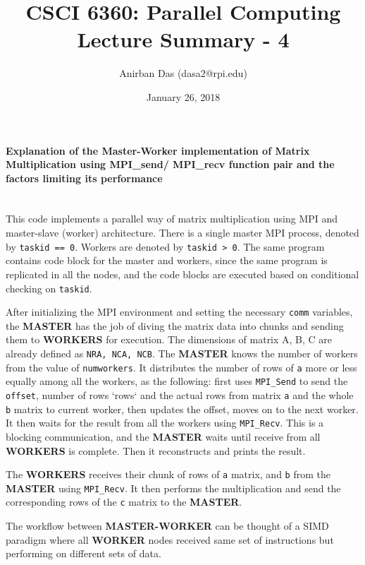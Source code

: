 \documentclass[a4paper,12 pt]{article}
\title{\vspace{-2.0cm}CSCI 6360: Parallel Computing Lecture Summary - 4}
\author{Anirban Das (dasa2@rpi.edu) }
\date{January 26, 2018}
\begin{document}
\maketitle

\paragraph{Explanation of the Master-Worker implementation of Matrix Multiplication using MPI\_send/ MPI\_recv function pair and the factors limiting its performance\\\\}

This code implements a parallel way of matrix multiplication using MPI and master-slave (worker) architecture. There is a single master MPI process, denoted by \texttt{taskid == 0}. Workers are denoted by \texttt{taskid > 0}. The same program contains code block for the master and workers, since the same program is replicated in all the nodes, and the code blocks are executed based on conditional checking on \texttt{taskid}. 

After initializing the MPI environment and setting the necessary \texttt{comm} variables, the \textbf{MASTER} has the job of diving the matrix data into chunks and sending them to \textbf{WORKERS} for execution. The dimensions of matrix A, B, C are already defined as \texttt{NRA, NCA, NCB}. The \textbf{MASTER} knows the number of workers from the value of \texttt{numworkers}. It distributes the number of rows of \texttt{a} more or less equally among all the workers, as the following: first uses \texttt{MPI\_Send} to send the \texttt{offset}, number of rows `rows` and the actual rows from matrix \texttt{a} and the whole \texttt{b} matrix to current worker, then updates the offset, moves on to the next worker. It then waits for the result from all the workers using \texttt{MPI\_Recv}. This is a blocking communication, and the \textbf{MASTER} waits until receive from all \textbf{WORKERS} is complete. Then it reconstructs and prints the result.

The \textbf{WORKERS} receives their chunk of rows of \texttt{a} matrix, and \texttt{b} from the \textbf{MASTER} using \texttt{MPI\_Recv}. It then performs the multiplication and send the corresponding rows of the \texttt{c} matrix to the \textbf{MASTER}.

The workflow between \textbf{MASTER-WORKER} can be thought of a SIMD paradigm where all \textbf{WORKER} nodes received same set of instructions but performing on different sets of data. \\
\end{document}
